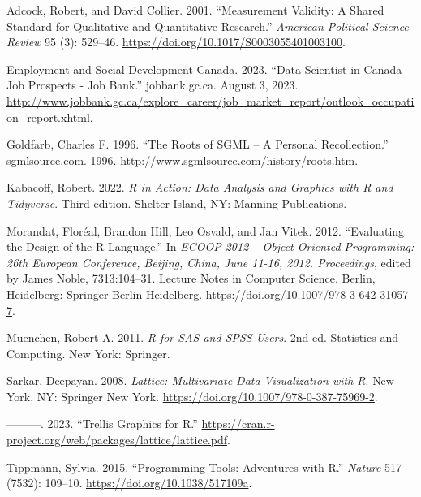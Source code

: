 \documentclass[
  letterpaper,
]{scrbook}
\newlength{\cslhangindent}
\newlength{\cslentryspacingunit} %
\newenvironment{CSLReferences}[2] %
 {%
  \setlength{\parindent}{0pt}
  \ifodd #1
  \let\oldpar\par
  \def\par{\hangindent=\cslhangindent\oldpar}
  \fi
  \setlength{\parskip}{#2\cslentryspacingunit}
 }%
 {}
\begin{document}
\hypertarget{refs}{}
\begin{CSLReferences}{1}{0}
\leavevmode{}%
Adcock, Robert, and David Collier. 2001. {``Measurement {Validity}: {A
Shared Standard} for {Qualitative} and {Quantitative Research}.''}
\emph{American Political Science Review} 95 (3): 529--46.
\url{https://doi.org/10.1017/S0003055401003100}.

\leavevmode{}%
Employment and Social Development Canada. 2023. {``Data {Scientist} in
{Canada} \textbar{} {Job} Prospects - {Job Bank}.''} {jobbank.gc.ca}.
August 3, 2023.
\url{http://www.jobbank.gc.ca/explore_career/job_market_report/outlook_occupation_report.xhtml}.

\leavevmode{}%
Goldfarb, Charles F. 1996. {``The {Roots} of {SGML} -- {A Personal
Recollection}.''} {sgmlsource.com}. 1996.
\url{http://www.sgmlsource.com/history/roots.htm}.

\leavevmode{}%
Kabacoff, Robert. 2022. \emph{R in Action: Data Analysis and Graphics
with {R} and {Tidyverse}}. Third edition. {Shelter Island, NY}: {Manning
Publications}.

\leavevmode{}%
Morandat, Floréal, Brandon Hill, Leo Osvald, and Jan Vitek. 2012.
{``Evaluating the {Design} of the {R Language}.''} In \emph{{ECOOP} 2012
-- {Object-Oriented Programming}: 26th {European Conference}, {Beijing},
{China}, {June} 11-16, 2012. {Proceedings}}, edited by James Noble,
7313:104--31. Lecture {Notes} in {Computer Science}. {Berlin,
Heidelberg}: {Springer Berlin Heidelberg}.
\url{https://doi.org/10.1007/978-3-642-31057-7}.

\leavevmode{}%
Muenchen, Robert A. 2011. \emph{R for {SAS} and {SPSS} Users}. 2nd ed.
Statistics and Computing. {New York}: {Springer}.

\leavevmode{}%
Sarkar, Deepayan. 2008. \emph{Lattice: {Multivariate Data Visualization}
with {R}}. {New York, NY}: {Springer New York}.
\url{https://doi.org/10.1007/978-0-387-75969-2}.

\leavevmode{}%
---------. 2023. {``Trellis {Graphics} for {R}.''}
\url{https://cran.r-project.org/web/packages/lattice/lattice.pdf}.

\leavevmode{}%
Tippmann, Sylvia. 2015. {``Programming Tools: {Adventures} with {R}.''}
\emph{Nature} 517 (7532): 109--10.
\url{https://doi.org/10.1038/517109a}.


\end{CSLReferences}
\end{document}
